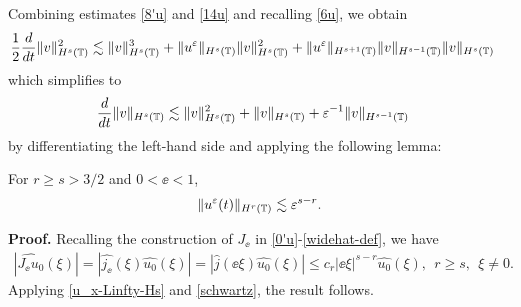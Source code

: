 %
%
Combining estimates \eqref{8'u} and \eqref{14u} and recalling
\eqref{6u}, we obtain
%
%
\begin{equation*}
\begin{split}
\frac{1}{2}\frac{d}{dt}\|v\|_{H^{s}(\mathbb{T})}^2
& \lesssim \|v\|_{H^s(\mathbb{T})}^3 + \|u^\varepsilon\|_{H^s(\mathbb{T})}
\|v\|_{H^s(\mathbb{T})}^2
 + \|u^\varepsilon\|_{H^{s+1}(\mathbb{T})}
\|v\|_{H^{s-1}(\mathbb{T})} \|v\|_{H^s(\mathbb{T})}
\end{split}
\end{equation*}
%
%
which simplifies to 
\begin{equation}
\begin{split}
\frac{d}{dt}\|v\|_{H^{s}(\mathbb{T})}
& \lesssim \|v\|_{H^s(\mathbb{T})}^2 + 
\|v\|_{H^s(\mathbb{T})}
+ \varepsilon^{-1}
\|v\|_{H^{s-1}(\mathbb{T})} 
\label{15u}
\end{split}
\end{equation}
by differentiating the left-hand side and applying the following lemma:
%
%
%
\begin{lemma}
\label{lem5r}
For $r \ge s > 3/2$ and $0 < \ee <1$, 
%
%
\begin{equation}
\begin{split}
\|u^{\varepsilon} (t) \|_{H^r(\mathbb{T})} \lesssim \varepsilon^{s-r}.
\label{700r}
\end{split}
\end{equation}
%
%
\end{lemma}
%
%
\textbf{Proof.} Recalling the construction of $J_\ee$ in 
\eqref{0'u}-\eqref{widehat-def},  we have
%
%
\begin{equation}
\label{schwartz}
\begin{split}
	|\widehat{J_\ee u_0}(\xi)| = |\widehat{j_\ee}(\xi) \widehat{u_0}(\xi)|
	= |\widehat{j }(\ee \xi) \widehat{u_0}(\xi)| \le c_r |\ee \xi 
	|^{s-r} \widehat{u_0}(\xi), \ \ r \ge s, \ \ \xi \neq 0.
\end{split}
\end{equation}
%
%
Applying \eqref{u_x-Linfty-Hs} and \eqref{schwartz}, the result follows.
\qquad \qedsymbol
%
%
%

